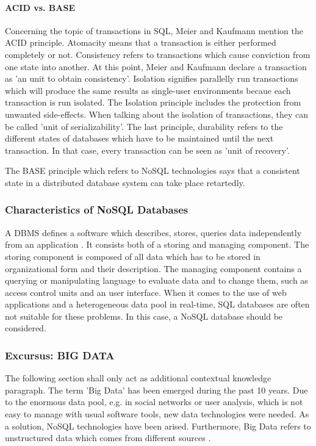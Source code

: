 \paragraph{ACID vs. BASE}

Concerning the topic of transactions in SQL, Meier and Kaufmann \cite[p.136 ff.]{nosql_meier} mention the \ac{ACID} principle. Atomacity means that a transaction is either performed completely or not. Consistency refers to transactions which cause conviction from one state into another. At this point, Meier and Kaufmann declare a transaction as 'an unit to obtain consistency'. Isolation signifies parallelly run transactions which will produce the same results as single-user environments becaue each transaction is run isolated. The Isolation principle includes the protection from unwanted side-effects. When talking about the isolation of transactions, they can be called 'unit of serializability'. The last principle, durability refers to the different states of databases which have to be maintained until the next transaction. In that case, every transaction can be seen as 'unit of recovery'.

The \ac{BASE} principle which refers to NoSQL technologies says that a consistent state in a distributed database system can take place retartedly.

\subsubsection{Characteristics of NoSQL Databases}

A \ac{DBMS} defines a software which describes, stores, queries data independently from an application \cite[p.2 ff.]{nosql_meier}. It consists both of a storing and managing component. The storing component is composed of all data which has to be stored in organizational form and their description. The managing component contains a querying or manipulating language to evaluate data and to change them, such as access control units and an user interface. When it comes to the use of web applications and a heterogeneous data pool in real-time, SQL databases are often not suitable for these problems. In this case, a NoSQL database should be considered. 

\subsubsection{Excursus: BIG DATA} \label{bigdata}

The following section shall only act as additional contextual knowledge paragraph. 
The term 'Big Data' has been emerged during the past 10 years. Due to the enormous data pool, e.g. in social networks or user analysis, which is not easy to manage with usual software tools, new data technologies were needed. As a solution, NoSQL technologies have been arised. Furthermore, Big Data refers to unstructured data which comes from different sources \cite{nosql_meier}. 

